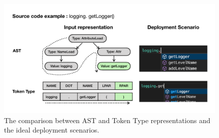 





















\begin{figure}[h]
    \centering
    \includegraphics[width=\columnwidth]{figures/motivation.pdf}
    \caption{The comparison between AST and Token Type representations and the ideal deployment scenarios.}
    \label{fig:motivation}
\end{figure}

